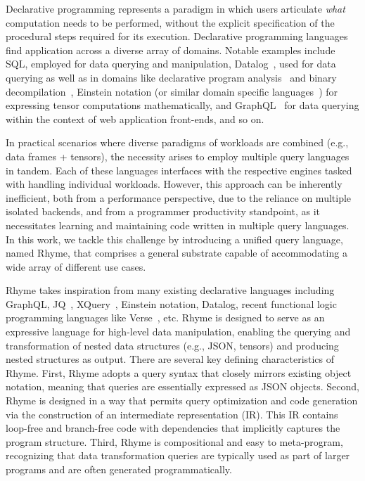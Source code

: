 \documentclass[runningheads]{llncs}
\newcommand{\lang}{Rhyme}
\begin{document}
Declarative programming represents a paradigm in which users articulate \emph{what}
computation needs to be performed, without the explicit specification of the
procedural steps required for its execution.
Declarative programming languages find application across a diverse array of
domains.
Notable examples include SQL, employed for data querying and manipulation,
Datalog~\cite{datalog}, used for data querying as well as in domains like
declarative program analysis~\cite{proganalysis_first, logic_proganalysis, souffle_cav}
and binary decompilation~\cite{ddissam}, Einstein notation (or similar domain
specific languages~\cite{tensor_comprehensions}) for expressing tensor computations
mathematically, and GraphQL~\cite{graphql} for data querying within the context of web application
front-ends, and so on.

In practical scenarios where diverse paradigms of workloads are combined
(e.g., data frames + tensors), the necessity arises to employ multiple
query languages in tandem.
Each of these languages interfaces with the respective engines tasked
with handling individual workloads.
However, this approach can be inherently inefficient, both from a performance
perspective, due to the reliance on multiple isolated backends, and from
a programmer productivity standpoint, as it necessitates learning and
maintaining code written in multiple query languages.
In this work, we tackle this challenge by introducing a unified query language, 
named \lang{},
that comprises a general substrate capable of accommodating a wide array of
different use cases.

\lang{} takes inspiration from many existing declarative languages
including GraphQL, JQ~\cite{jq}, XQuery~\cite{xquery}, Einstein notation,
Datalog, recent functional logic programming languages like Verse~\cite{verse}, etc.
\lang{} is designed to serve as an expressive language for high-level data
manipulation, enabling the querying and transformation of nested data structures
(e.g., JSON, tensors)
and producing nested structures as output.
There are several key defining characteristics of \lang{}.
First, \lang{} adopts a query syntax that closely mirrors existing object notation,
meaning that queries are essentially expressed as JSON objects.
Second, \lang{} is designed in a way that permits query optimization and
code generation via the construction of an intermediate representation (IR).
This IR contains loop-free and branch-free code with dependencies that implicitly
captures the program structure.
Third, \lang{} is compositional and easy to meta-program, recognizing that data
transformation queries are typically used as part of larger programs and are often
generated programmatically.
\end{document}
